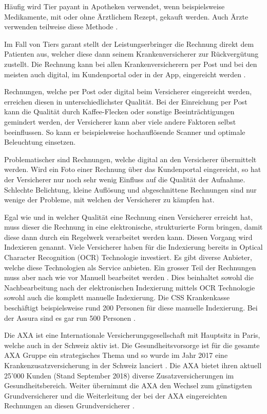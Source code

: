 \documentclass[12pt, twoside]{extarticle}
\begin{document}
Häufig wird Tier payant in Apotheken verwendet, wenn beispielsweise Medikamente, mit oder ohne Ärztlichem Rezept, gekauft werden. Auch Ärzte verwenden teilweise diese Methode .

Im Fall von Tiers garant stellt der Leistungserbringer die Rechnung direkt dem Patienten aus, welcher diese dann seinem Krankenversicherer zur Rückvergütung zustellt. Die Rechnung kann bei allen Krankenversicherern per Post und bei den meisten auch digital, im Kundenportal oder in der App, eingereicht werden \cite{EidgenossischesDepartementdesInnern2017FaktenblattVergutungssysteme}.

Rechnungen, welche per Post oder digital beim Versicherer eingereicht werden, erreichen diesen in unterschiedlichster Qualität. Bei der Einreichung per Post kann die Qualität durch Kaffee-Flecken oder sonstige Beeinträchtigungen gemindert werden, der Versicherer kann aber viele andere Faktoren selbst beeinflussen. So kann er beispielsweise hochauflösende Scanner und optimale Beleuchtung einsetzen.

Problematischer sind Rechnungen, welche digital an den Versicherer übermittelt werden. Wird ein Foto einer Rechnung über das Kundenportal eingereicht, so hat der Versicherer nur noch sehr wenig Einfluss auf die Qualität der Aufnahme. Schlechte Belichtung, kleine Auflösung und abgeschnittene Rechnungen sind nur wenige der Probleme, mit welchen der Versicherer zu kämpfen hat.

Egal wie und in welcher Qualität eine Rechnung einen Versicherer erreicht hat, muss dieser die Rechnung in eine elektronische, strukturierte Form bringen, damit diese dann durch ein Regelwerk verarbeitet werden kann. Diesen Vorgang wird Indexieren genannt. Viele Versicherer haben für die Indexierung bereits in Optical Character Recognition (OCR) Technologie investiert. Es gibt diverse Anbieter, welche diese Technologien als Service anbieten. Ein grosser Teil der Rechnungen muss aber nach wie vor Manuell bearbeitet werden . Dies beinhaltet sowohl die Nachbearbeitung nach der elektronischen Indexierung mittels OCR Technologie sowohl auch die komplett manuelle Indexierung. Die CSS Krankenkasse beschäftigt beispielsweise rund 200 Personen für diese manuelle Indexierung. Bei der Assura sind es gar run 500 Personen .

Die AXA ist eine Internationale Versicherungsgesellschaft mit Hauptsitz in Paris, welche auch in der Schweiz aktiv ist. Die Gesundheitsvorsorge ist für die gesamte AXA Gruppe ein strategisches Thema und so wurde im Jahr 2017 eine Krankenzusatzversicherung in der Schweiz lanciert \cite{finanzen.ch2017AxaGewinnen}. Die AXA bietet ihren aktuell 25'000 Kunden (Stand September 2018)  diverse Zusatzversicherungen im Gesundheitsbereich. Weiter übernimmt die AXA den Wechsel zum günstigsten Grundversicherer und die Weiterleitung der bei der AXA eingereichten Rechnungen an diesen Grundversicherer \cite{finanzen.ch2017AxaGewinnen}.
\end{document}

